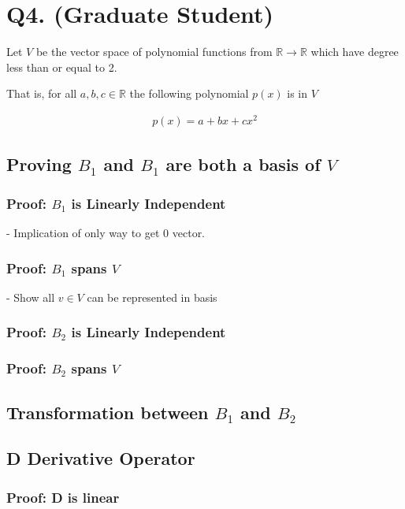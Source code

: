 \documentclass{article}
\begin{document}
    \section{Q4. (Graduate Student)}

    Let $V$ be the vector space of polynomial functions from $\mathbb{R} \rightarrow \mathbb{R}$ which have degree less than or equal to 2.

    That is, for all $a, b, c \in \mathbb{R}$ the following polynomial $p(x)$ is in $V$
    
    \begin{align*}
    p(x) = a + bx + cx^2
    \end{align*}    

    \subsection{Proving $B_1$ and $B_1$ are both a basis of $V$}

    \subsubsection{Proof: $B_1$ is Linearly Independent}
    - Implication of only way to get 0 vector.
    \subsubsection{Proof: $B_1$ spans $V$}
    - Show all $v \in V$ can be represented in basis

    \subsubsection{Proof: $B_2$ is Linearly Independent}

    \subsubsection{Proof: $B_2$ spans $V$}

    \subsection{Transformation between $B_1$ and $B_2$}

    \subsection{D Derivative Operator}

    \subsubsection{Proof: D is linear}
\end{document}
